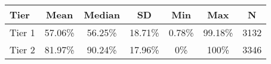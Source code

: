 \begin{tabular}{lcccccc}
\toprule 
\midrule 
Tier & Mean & Median & SD & Min & Max & N \\
\midrule 
Tier 1 & 57.06\% & 56.25\% & 18.71\% & 0.78\% & 99.18\% & 3132 \\
Tier 2 & 81.97\% & 90.24\% & 17.96\% & 0\% & 100\% & 3346 \\
\midrule 
\bottomrule 
\end{tabular}
